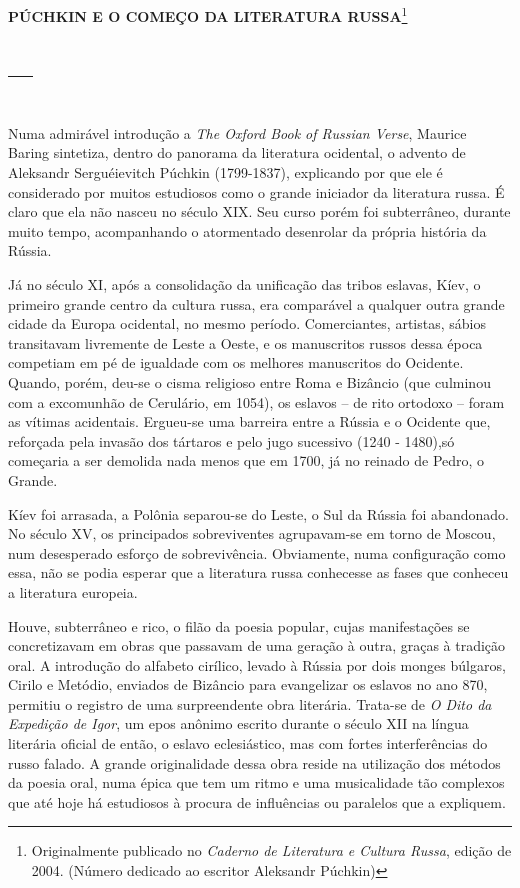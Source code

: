 \textbf{PÚCHKIN E O COMEÇO DA LITERATURA RUSSA}\footnote{Originalmente
  publicado no \emph{Caderno de Literatura e Cultura Russa}, edição de
  2004. (Número dedicado ao escritor Aleksandr Púchkin)}

\textbf{~}

\begin{longtable}[]{@{}l@{}}
\toprule
~\tabularnewline
\bottomrule
\end{longtable}

Numa admirável introdução a \emph{The Oxford Book of Russian Verse},
Maurice Baring sintetiza, dentro do panorama da literatura ocidental, o
advento de Aleksandr Serguéievitch Púchkin (1799-1837), explicando por
que ele é considerado por muitos estudiosos como o grande iniciador da
literatura russa. É claro que ela não nasceu no século XIX. Seu curso
porém foi subterrâneo, durante muito tempo, acompanhando o atormentado
desenrolar da própria história da Rússia.

Já no século XI, após a consolidação da unificação das tribos eslavas,
Kíev, o primeiro grande centro da cultura russa, era comparável a
qualquer outra grande cidade da Europa ocidental, no mesmo período.
Comerciantes, artistas, sábios transitavam livremente de Leste a Oeste,
e os manuscritos russos dessa época competiam em pé de igualdade com os
melhores manuscritos do Ocidente. Quando, porém, deu-se o cisma
religioso entre Roma e Bizâncio (que culminou com a excomunhão de
Cerulário, em 1054), os eslavos -- de rito ortodoxo -- foram as vítimas
acidentais. Ergueu-se uma barreira entre a Rússia e o Ocidente que,
reforçada pela invasão dos tártaros e pelo jugo sucessivo (1240 -
1480),só começaria a ser demolida nada menos que em 1700, já no reinado
de Pedro, o Grande.

Kíev foi arrasada, a Polônia separou-se do Leste, o Sul da Rússia foi
abandonado. No século XV, os principados sobreviventes agrupavam-se em
torno de Moscou, num desesperado esforço de sobrevivência. Obviamente,
numa configuração como essa, não se podia esperar que a literatura russa
conhecesse as fases que conheceu a literatura europeia.

Houve, subterrâneo e rico, o filão da poesia popular, cujas
manifestações se concretizavam em obras que passavam de uma geração à
outra, graças à tradição oral. A introdução do alfabeto cirílico, levado
à Rússia por dois monges búlgaros, Cirilo e Metódio, enviados de
Bizâncio para evangelizar os eslavos no ano 870, permitiu o registro de
uma surpreendente obra literária. Trata-se de \emph{O Dito da Expedição
de Igor}, um epos anônimo escrito durante o século XII na língua
literária oficial de então, o eslavo eclesiástico, mas com fortes
interferências do russo falado. A grande originalidade dessa obra reside
na utilização dos métodos da poesia oral, numa épica que tem um ritmo e
uma musicalidade tão complexos que até hoje há estudiosos à procura de
influências ou paralelos que a expliquem.

